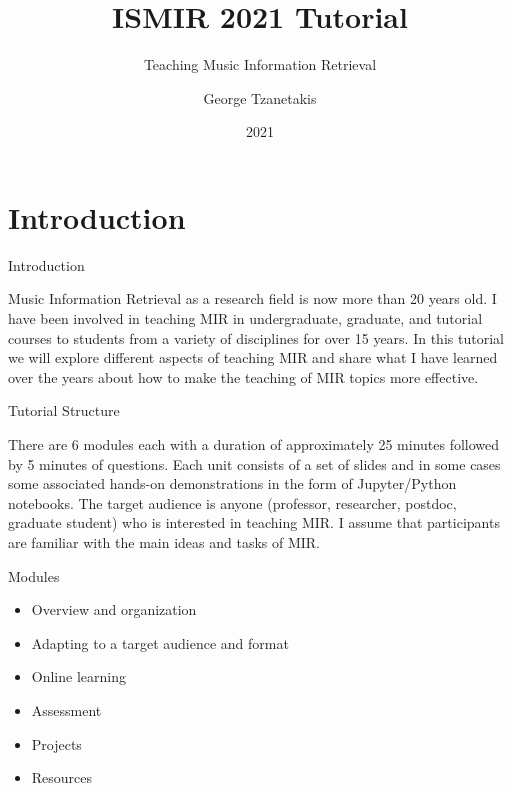 \documentclass[12pt]{beamer}
\title[ISMIR 2021 tutorial]{ISMIR 2021 Tutorial}
\subtitle[Teaching Music Information Retrieval]{Teaching Music Information Retrieval}
\date[2021]{2021}
\author[G. Tzanetakis]{George Tzanetakis}
\institute[University of Victoria]{University of Victoria}
\begin{document}
\frame{\maketitle} %






\section{Introduction} 

\begin{frame}{Introduction} 

Music Information Retrieval as a research field is now more than 20
years old.  I have been involved in teaching MIR in undergraduate,
graduate, and tutorial courses to students from a variety of
disciplines for over 15 years. In this tutorial we will explore
different aspects of teaching MIR and share what I have learned over
the years about how to make the teaching of MIR topics more effective.

\end{frame} 


\begin{frame}{Tutorial Structure} 

There are 6 modules each with a duration of approximately 25 minutes
followed by 5 minutes of questions. Each unit consists of a set of
slides and in some cases some associated hands-on demonstrations in
the form of Jupyter/Python notebooks. The target audience is anyone
(professor, researcher, postdoc, graduate student) who is interested
in teaching MIR. I assume that participants are familiar with the main
ideas and tasks of MIR.

\end{frame} 

\begin{frame}{Modules} 
\begin{itemize} 
\item Overview and organization
\item Adapting to a target audience and format 
\item Online learning
\item Assessment 
\item Projects 
\item Resources 
\end{itemize} 
\end{frame}
\end{document}
